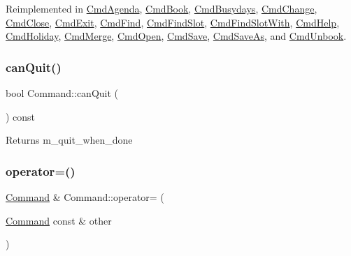 Reimplemented in \hyperlink{classCmdAgenda_ab723208cb36623b3d4583e1fae6f22be}{Cmd\+Agenda}, \hyperlink{classCmdBook_ad3d3448c7cc058a1ca346d85e40abc66}{Cmd\+Book}, \hyperlink{classCmdBusydays_af53f2b27156a0e94911dd5e6ae4149f8}{Cmd\+Busydays}, \hyperlink{classCmdChange_a4c3bdb844bb270715716e21e20bb9c7f}{Cmd\+Change}, \hyperlink{classCmdClose_a012e10635d377e533acfadf05e034654}{Cmd\+Close}, \hyperlink{classCmdExit_a51706475cf423b184855ba45fd7fa1a7}{Cmd\+Exit}, \hyperlink{classCmdFind_a113977b5959b9d2014a3a47b3f42340e}{Cmd\+Find}, \hyperlink{classCmdFindSlot_a01d81fa82fa98c28d353bf7ea28a2afe}{Cmd\+Find\+Slot}, \hyperlink{classCmdFindSlotWith_a0889715eef40b0c204fd97fef5050894}{Cmd\+Find\+Slot\+With}, \hyperlink{classCmdHelp_adae5afd78e75a73735d0ced85b5604a5}{Cmd\+Help}, \hyperlink{classCmdHoliday_adaaed1d04098dde0bfa8b3d6c3d322e1}{Cmd\+Holiday}, \hyperlink{classCmdMerge_a426f4d5c54b67471fff531adb8010fb8}{Cmd\+Merge}, \hyperlink{classCmdOpen_adc72961afcb2a282e4e627273e111281}{Cmd\+Open}, \hyperlink{classCmdSave_a44fb7fe716f0d65f597e7eccb647ba3d}{Cmd\+Save}, \hyperlink{classCmdSaveAs_a12607c0c78b9eec192fa11d6addbb567}{Cmd\+Save\+As}, and \hyperlink{classCmdUnbook_a1504b0d1183a3ccd2487b3cab4bb5e0d}{Cmd\+Unbook}.

\mbox{\label{classCommand_a0ec10c9753786caf083aba08cf85afb0}} 
\subsubsection{\texorpdfstring{can\+Quit()}{canQuit()}}
{\footnotesize\ttfamily bool Command\+::can\+Quit (\begin{DoxyParamCaption}{ }\end{DoxyParamCaption}) const}

\begin{DoxyReturn}{Returns}
m\+\_\+quit\+\_\+when\+\_\+done 
\end{DoxyReturn}
\mbox{\label{classCommand_a378451c967b9d585492a778bab58f803}} 
\subsubsection{\texorpdfstring{operator=()}{operator=()}}
{\footnotesize\ttfamily \hyperlink{classCommand}{Command} \& Command\+::operator= (\begin{DoxyParamCaption}\item[{\hyperlink{classCommand}{Command} const \&}]{other }\end{DoxyParamCaption})}

